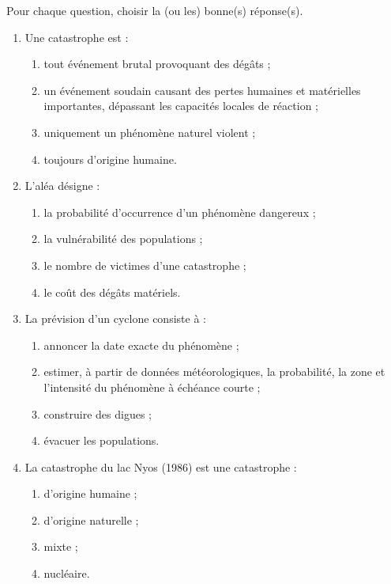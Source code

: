 \documentclass[11pt]{article}
\newcommand{\cle}[1]{{\popxbold\color{popdark}#1}}
\begin{document}
\begin{exercice}
Pour chaque question, choisir la (ou les) bonne(s) réponse(s).
\begin{enumerate}
\item Une \cle{catastrophe} est :
\begin{enumerate}
\item tout événement brutal provoquant des dégâts ;
\item un événement soudain causant des pertes humaines et matérielles importantes, dépassant les capacités locales de réaction ;
\item uniquement un phénomène naturel violent ;
\item toujours d'origine humaine.
\end{enumerate}
\item L'\cle{aléa} désigne :
\begin{enumerate}
\item la probabilité d'occurrence d'un phénomène dangereux ;
\item la vulnérabilité des populations ;
\item le nombre de victimes d'une catastrophe ;
\item le coût des dégâts matériels.
\end{enumerate}
\item La \cle{prévision} d'un cyclone consiste à :
\begin{enumerate}
\item annoncer la date exacte du phénomène ;
\item estimer, à partir de données météorologiques, la probabilité, la zone et l'intensité du phénomène à échéance courte ;
\item construire des digues ;
\item évacuer les populations.
\end{enumerate}
\item La catastrophe du lac Nyos (1986) est une catastrophe :
\begin{enumerate}
\item d'origine humaine ;
\item d'origine naturelle ;
\item mixte ;
\item nucléaire.
\end{enumerate}
\end{enumerate}
\end{exercice}
\end{document}
